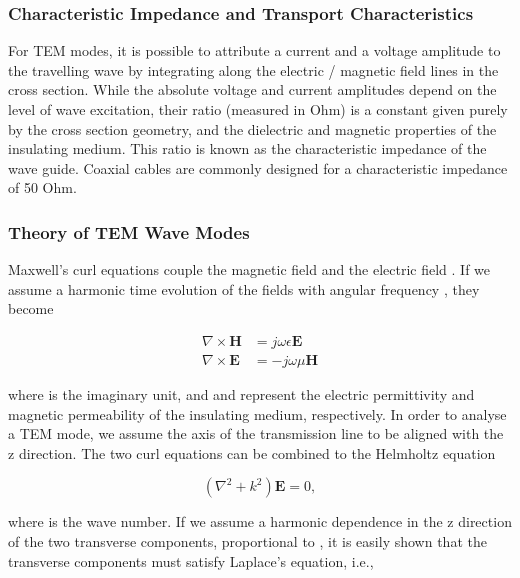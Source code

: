 \subsubsection{Characteristic Impedance and Transport
Characteristics}\label{characteristic-impedance-and-transport-characteristics}

For TEM modes, it is possible to attribute a current and a voltage
amplitude to the travelling wave by integrating along the electric /
magnetic field lines in the cross section. While the absolute voltage
and current amplitudes depend on the level of wave excitation, their
ratio (measured in Ohm) is a constant given purely by the cross section
geometry, and the dielectric and magnetic properties of the insulating
medium. This ratio is known as the characteristic impedance  of
the wave guide. Coaxial cables are commonly designed for a
characteristic impedance of 50 Ohm.

\subsubsection{Theory of TEM Wave Modes}\label{theory-of-tem-wave-modes}

Maxwell's curl equations couple the magnetic field  and
the electric field . If we assume a harmonic time
evolution of the fields with angular frequency \m{\omega}, they become

\begin{eqnarray}
\nabla \times \mathbf{H} &= j \omega \epsilon \mathbf{E} \\
\nabla \times \mathbf{E} &= - j\omega \mu \mathbf{H}
\end{eqnarray}

where  is the imaginary unit, and \m{\epsilon} and
\m{\mu} represent the electric permittivity and magnetic permeability of
the insulating medium, respectively. In order to analyse a TEM mode, we
assume the axis of the transmission line to be aligned with the z
direction. The two curl equations can be combined to the Helmholtz
equation

\begin{equation}
(\nabla^2+k^2) \mathbf{E}  =0,
\end{equation}

where  is the wave number. If we assume a
harmonic dependence in the z direction of the two transverse components,
proportional to , it is easily shown that the transverse
components must satisfy Laplace's equation, i.e.,

